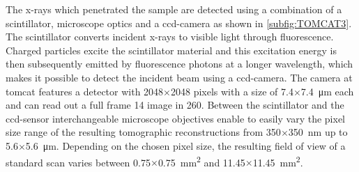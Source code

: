 The x-rays which penetrated the sample are detected using a combination of a scintillator, microscope optics and a \ac{ccd}-camera as shown in \autoref{subfig:TOMCAT3}. The scintillator converts incident x-rays to visible light through fluorescence. Charged particles excite the scintillator material and this excitation energy is then subsequently emitted by fluorescence photons at a longer wavelength, which makes it possible to detect the incident beam using a \ac{ccd}-camera. The camera at \ac{tomcat} features a detector with 2048$\times$2048 pixels with a size of 7.4$\times$\SI{7.4}{\micro\meter} each and can read out a full frame \SI{14}{\bit} image in \SI{260}{\millisecond}. Between the scintillator and the \ac{ccd}-sensor interchangeable microscope objectives enable to easily vary the pixel size range of the resulting tomographic reconstructions from 350$\times$\SI{350}{\nano\meter} up to 5.6$\times$\SI{5.6}{\micro\meter}. Depending on the chosen pixel size, the resulting field of view of a standard scan varies between 0.75$\times$\SI{0.75}{\milli\meter\squared} and 11.45$\times$\SI{11.45}{\milli\meter\squared}.

